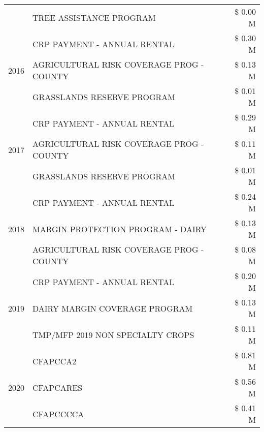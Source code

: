 \begin{tabular}{llr}
 & TREE ASSISTANCE PROGRAM & \$ 0.00 M \\
\cline{1-3}
\multirow[t]{3}{*}{2016} & CRP PAYMENT - ANNUAL RENTAL & \$ 0.30 M \\
 & AGRICULTURAL RISK COVERAGE PROG - COUNTY & \$ 0.13 M \\
 & GRASSLANDS RESERVE PROGRAM & \$ 0.01 M \\
\cline{1-3}
\multirow[t]{3}{*}{2017} & CRP PAYMENT - ANNUAL RENTAL & \$ 0.29 M \\
 & AGRICULTURAL RISK COVERAGE PROG - COUNTY & \$ 0.11 M \\
 & GRASSLANDS RESERVE PROGRAM & \$ 0.01 M \\
\cline{1-3}
\multirow[t]{3}{*}{2018} & CRP PAYMENT - ANNUAL RENTAL & \$ 0.24 M \\
 & MARGIN PROTECTION PROGRAM - DAIRY & \$ 0.13 M \\
 & AGRICULTURAL RISK COVERAGE PROG - COUNTY & \$ 0.08 M \\
\cline{1-3}
\multirow[t]{3}{*}{2019} & CRP PAYMENT - ANNUAL RENTAL & \$ 0.20 M \\
 & DAIRY MARGIN COVERAGE PROGRAM & \$ 0.13 M \\
 & TMP/MFP 2019 NON SPECIALTY CROPS & \$ 0.11 M \\
\cline{1-3}
\multirow[t]{3}{*}{2020} & CFAPCCA2 & \$ 0.81 M \\
 & CFAPCARES & \$ 0.56 M \\
 & CFAPCCCCA & \$ 0.41 M \\
\cline{1-3}
\bottomrule
\end{tabular}
